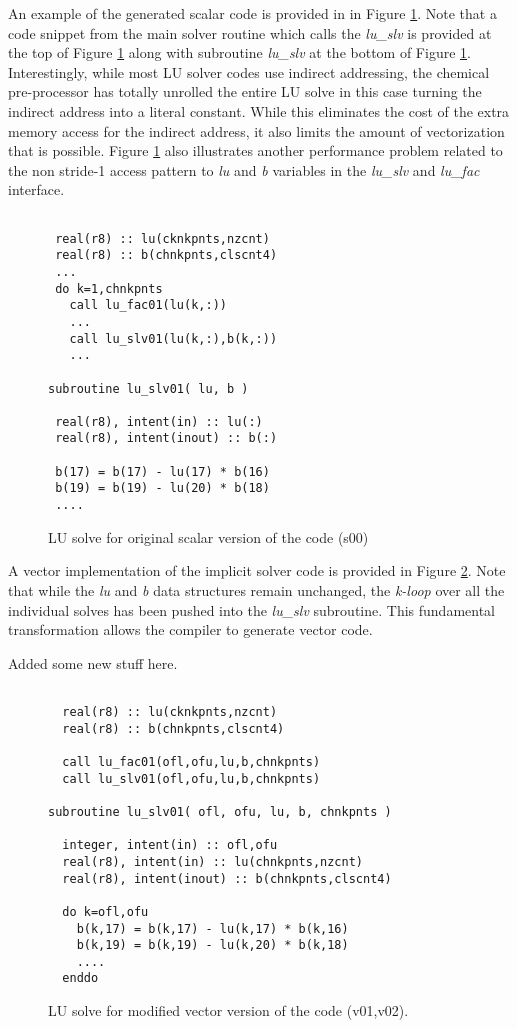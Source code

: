    An example of the generated scalar code is provided in in Figure \ref{fig:s00}.  Note that a code snippet from the main solver routine which calls the {\em lu\_slv} is provided at the top of Figure \ref{fig:s00} along with subroutine {\em lu\_slv} at the bottom of Figure \ref{fig:s00}.  Interestingly, while most LU solver codes use indirect addressing, the chemical pre-processor has totally unrolled the entire LU solve in this case turning the indirect address into a literal constant.  While this eliminates the cost of the extra memory access for the indirect address, it also limits the amount of vectorization that is possible.  Figure \ref{fig:s00} also illustrates another performance problem related to the non stride-1 access pattern to {\em lu} and {\em b} variables in the {\em lu\_slv} and {\em lu\_fac} interface.  

\begin{figure}
\begin{verbatim}

 real(r8) :: lu(cknkpnts,nzcnt)
 real(r8) :: b(chnkpnts,clscnt4)
 ...
 do k=1,chnkpnts
   call lu_fac01(lu(k,:))
   ...
   call lu_slv01(lu(k,:),b(k,:))
   ...
   
subroutine lu_slv01( lu, b )

 real(r8), intent(in) :: lu(:)
 real(r8), intent(inout) :: b(:)

 b(17) = b(17) - lu(17) * b(16)
 b(19) = b(19) - lu(20) * b(18)
 ....
\end{verbatim}
\caption{LU solve for original scalar version of the code (s00)}
\label{fig:s00}
\end{figure}

     A vector implementation of the implicit solver code is provided in Figure \ref{fig:chem-v01}.  Note that while the {\em lu} and {\em b} data structures remain unchanged, the {\em k-loop} over all the individual solves has been pushed into the {\em lu\_slv} subroutine.  This fundamental transformation allows the compiler to generate vector code.  
     
     Added some new stuff here.

\begin{figure}
\begin{verbatim}

  real(r8) :: lu(cknkpnts,nzcnt)
  real(r8) :: b(chnkpnts,clscnt4)

  call lu_fac01(ofl,ofu,lu,b,chnkpnts)
  call lu_slv01(ofl,ofu,lu,b,chnkpnts)

subroutine lu_slv01( ofl, ofu, lu, b, chnkpnts )

  integer, intent(in) :: ofl,ofu
  real(r8), intent(in) :: lu(chnkpnts,nzcnt)
  real(r8), intent(inout) :: b(chnkpnts,clscnt4)

  do k=ofl,ofu
    b(k,17) = b(k,17) - lu(k,17) * b(k,16)
    b(k,19) = b(k,19) - lu(k,20) * b(k,18)
    ....
  enddo

\end{verbatim}
\caption{LU solve for modified vector version of the code (v01,v02).}
\label{fig:chem-v01}
\end{figure}



